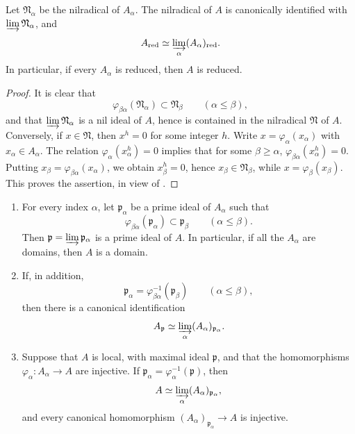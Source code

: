 \begin{corollary}[5.13.2]
\label{IV.5.13.2}
Let $\mathfrak N_\alpha$ be the nilradical of $A_\alpha$.  The
nilradical of $A$ is canonically identified with
$\varinjlim\mathfrak N_\alpha$, and
\[
  A_{\mathrm{red}}
  \simeq
  \varinjlim_\alpha(A_\alpha)_{\mathrm{red}}.
\]
In particular, if every $A_\alpha$ is reduced, then $A$ is
reduced.
\end{corollary}


\begin{proof}
It is clear that
\[
  \varphi_{\beta\alpha}(\mathfrak N_\alpha)
  \subset\mathfrak N_\beta
  \qquad(\alpha\leq\beta),
\]
and that $\varinjlim\mathfrak N_\alpha$ is a nil ideal of $A$,
hence is contained in the nilradical $\mathfrak N$ of $A$.
Conversely, if $x\in\mathfrak N$, then $x^h=0$ for some integer
$h$.  Write $x=\varphi_\alpha(x_\alpha)$ with
$x_\alpha\in A_\alpha$.  The relation
$\varphi_\alpha(x_\alpha^h)=0$ implies that for some
$\beta\geq\alpha$, $\varphi_{\beta\alpha}(x_\alpha^h)=0$.
Putting $x_\beta=\varphi_{\beta\alpha}(x_\alpha)$, we obtain
$x_\beta^h=0$, hence $x_\beta\in\mathfrak N_\beta$, while
$x=\varphi_\beta(x_\beta)$.  This proves the assertion, in view
of .
\end{proof}

\begin{proposition}[5.13.3]
\label{IV.5.13.3}
\begin{enumerate}[{\rm(i)}]
  \item For every index $\alpha$, let $\mathfrak p_\alpha$ be a
  prime ideal of $A_\alpha$ such that
  \[
    \varphi_{\beta\alpha}(\mathfrak p_\alpha)
    \subset\mathfrak p_\beta
    \qquad(\alpha\leq\beta).
  \]
  Then $\mathfrak p=\varinjlim\mathfrak p_\alpha$ is a prime
  ideal of $A$.  In particular, if all the $A_\alpha$ are
  domains, then $A$ is a domain.

  \item If, in addition,
  \[
    \mathfrak p_\alpha
    =\varphi_{\beta\alpha}^{-1}(\mathfrak p_\beta)
    \qquad(\alpha\leq\beta),
  \]
  then there is a canonical identification
  \[
    A_{\mathfrak p}
    \simeq
    \varinjlim_\alpha(A_\alpha)_{\mathfrak p_\alpha}.
  \]

  \item Suppose that $A$ is local, with maximal ideal
  $\mathfrak p$, and that the homomorphisms
  $\varphi_\alpha:A_\alpha\to A$ are injective.  If
  $\mathfrak p_\alpha=\varphi_\alpha^{-1}(\mathfrak p)$, then
  \[
    A
    \simeq
    \varinjlim_\alpha(A_\alpha)_{\mathfrak p_\alpha},
  \]
  and every canonical homomorphism
  $(A_\alpha)_{\mathfrak p_\alpha}\to A$ is injective.
\end{enumerate}
\end{proposition}

